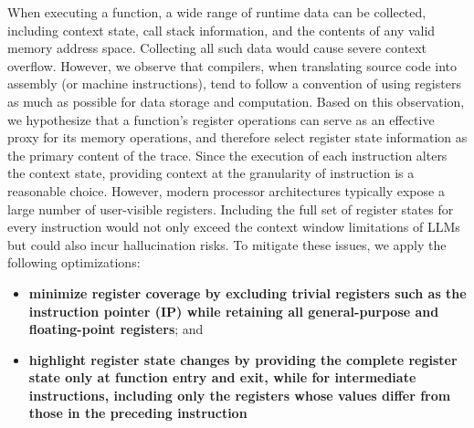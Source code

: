 \documentclass[acmsmall,screen,review,anonymous]{acmart} %
\begin{document}
When executing a function, a wide range of runtime data can be collected, including context state, call stack information, and the contents of any valid memory address space. Collecting all such data would cause severe context overflow. However, we observe that compilers, when translating source code into assembly (or machine instructions), tend to follow a convention of using registers as much as possible for data storage and computation. Based on this observation, we hypothesize that a function’s register operations can serve as an effective proxy for its memory operations, and therefore select register state information as the primary content of the trace. Since the execution of each instruction alters the context state, providing context at the granularity of instruction is a reasonable choice. However, modern processor architectures typically expose a large number of user-visible registers. Including the full set of register states for every instruction would not only exceed the context window limitations of LLMs but could also incur hallucination risks. To mitigate these issues, we apply the following optimizations:
\begin{itemize}
    \item \textbf{minimize register coverage by excluding trivial registers such as the instruction pointer (IP) while retaining all general-purpose and floating-point registers}; and
    \item \textbf{highlight register state changes by providing the complete register state only at function entry and exit, while for intermediate instructions, including only the registers whose values differ from those in the preceding instruction}
\end{itemize}



\end{document}

